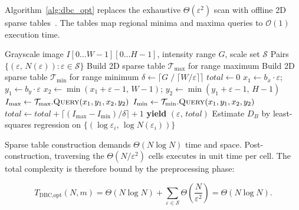 Algorithm~\ref{alg:dbc_opt} replaces the exhaustive $\Theta(\varepsilon^2)$ scan with offline 2D sparse tables~\cite{Liu2014}. The tables map regional minima and maxima queries to $\mathcal{O}(1)$ execution time.

\begin{algorithm}[t]
\caption{Optimized Differential Box-Counting (Sparse Tables)}
\label{alg:dbc_opt}
\begin{algorithmic}[1]
\Require Grayscale image $I[0\ldots W{-}1][0\ldots H{-}1]$, intensity range $G$, scale set $\mathcal{S}$
\Ensure Pairs $\{(\varepsilon,\, N(\varepsilon)) : \varepsilon \in \mathcal{S}\}$
\State Build 2D sparse table $\mathcal{T}_{\max}$ for range maximum \hfill {}
\State Build 2D sparse table $\mathcal{T}_{\min}$ for range minimum \hfill {}
  \State $\delta \leftarrow \lceil G \;/\; \lceil W/\varepsilon \rceil \rceil$
  \State $\mathit{total} \leftarrow 0$
      \State $x_1 \leftarrow b_x{\cdot}\varepsilon$;\; $y_1 \leftarrow b_y{\cdot}\varepsilon$
      \State $x_2 \leftarrow \min(x_1{+}\varepsilon{-}1,\,W{-}1)$;\; $y_2 \leftarrow \min(y_1{+}\varepsilon{-}1,\,H{-}1)$
      \State $I_{\max} \leftarrow \mathcal{T}_{\max}.\textsc{Query}(x_1, y_1, x_2, y_2)$ \hfill{}
      \State $I_{\min} \leftarrow \mathcal{T}_{\min}.\textsc{Query}(x_1, y_1, x_2, y_2)$ \hfill{}
      \State $\mathit{total} \leftarrow \mathit{total} + \lceil (I_{\max}{-}I_{\min})/\delta \rceil + 1$
    \EndFor
  \EndFor
  \State \textbf{yield} $(\varepsilon,\, \mathit{total})$
\EndFor
\State Estimate $D_B$ by least-squares regression on $\{(\log \varepsilon_i,\, \log N(\varepsilon_i))\}$
\end{algorithmic}
\end{algorithm}

Sparse table construction demands $\Theta(N \log N)$ time and space. Post-construction, traversing the $\Theta(N/\varepsilon^2)$ cells executes in unit time per cell. The total complexity is therefore bound by the preprocessing phase:

\begin{equation}
  T_{\text{DBC,opt}}(N, m)
    = \Theta(N \log N) + \sum_{\varepsilon \in \mathcal{S}} \Theta\!\left(\frac{N}{\varepsilon^{2}}\right)
    = \Theta(N \log N).
  \label{eq:dbc_opt_total}
\end{equation}


